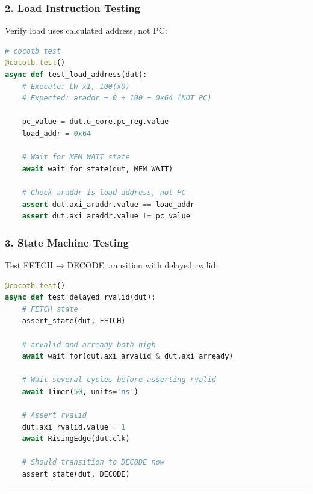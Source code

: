 \subsubsection{2. Load Instruction Testing}\label{cr:fix:critical-fixes:2-load-instruction-testing}

\begin{record}

Verify load uses calculated address, not PC:

\begin{lstlisting}[language=Python]
# cocotb test
@cocotb.test()
async def test_load_address(dut):
    # Execute: LW x1, 100(x0)
    # Expected: araddr = 0 + 100 = 0x64 (NOT PC)

    pc_value = dut.u_core.pc_reg.value
    load_addr = 0x64

    # Wait for MEM_WAIT state
    await wait_for_state(dut, MEM_WAIT)

    # Check araddr is load address, not PC
    assert dut.axi_araddr.value == load_addr
    assert dut.axi_araddr.value != pc_value
\end{lstlisting}

\end{record}

\subsubsection{3. State Machine Testing}\label{cr:fix:critical-fixes:3-state-machine-testing}

\begin{record}

Test FETCH → DECODE transition with delayed rvalid:

\begin{lstlisting}[language=Python]
@cocotb.test()
async def test_delayed_rvalid(dut):
    # FETCH state
    assert_state(dut, FETCH)

    # arvalid and arready both high
    await wait_for(dut.axi_arvalid & dut.axi_arready)

    # Wait several cycles before asserting rvalid
    await Timer(50, units='ns')

    # Assert rvalid
    dut.axi_rvalid.value = 1
    await RisingEdge(dut.clk)

    # Should transition to DECODE now
    assert_state(dut, DECODE)
\end{lstlisting}

\begin{center}\rule{0.5\linewidth}{0.5pt}\end{center}

\end{record}

